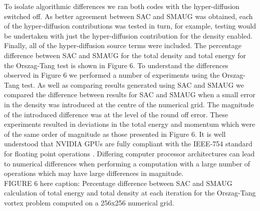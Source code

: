 \documentclass[final,1p]{elsarticle}
\begin{document}
 To isolate algorithmic differences we ran both codes with the hyper-diffusion switched off. As better agreement between SAC and SMAUG was obtained, each of the hyper-diffusion contributions was tested in turn, for example, testing would be undertaken with just the hyper-diffusion contribution for the density enabled. Finally, all of the hyper-diffusion  source terms were included. The percentage difference between SAC and SMAUG for the total density and total energy for the Orszag-Tang test is shown in Figure 6. To understand the differences observed in Figure 6  we performed a number of experiments using the Orszag-Tang test. As well as comparing results generated using SAC and SMAUG we compared the difference between results for SAC and SMAUG when a small error in the density was introduced at the centre of the numerical grid. The magnitude of the introduced difference was at the level of the round off error. These experiments resulted in deviations in the total energy and momentum which were of the same order of magnitude as those presented in Figure 6. It is well understood that NVIDIA GPUs are fully compliant with the IEEE-754 standard for floating point operations \cite{Whitehead2011}. Differing computer processor architectures can lead to numerical differences when performing a computation with a large number of operations which may have large differences in magnitude.\\





FIGURE 6 here caption: Percentage difference between SAC and SMAUG calculation of total energy and total density at each iteration for the Orszag-Tang vortex problem computed on a 256x256 numerical grid.\\


\end{document}
